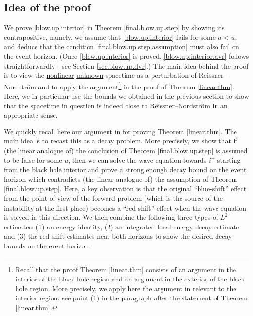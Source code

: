 \documentclass[10pt, reqno]{amsart}
\theoremstyle{definition}
\theoremstyle{remark}
\numberwithin{equation}{section}
\newcommand{\0}{\emptyset}
\begin{document}
\subsection{Idea of the proof}\label{idea.instab}

We prove \eqref{blow.up.interior} in Theorem \ref{final.blow.up.step} by showing its contrapositive, namely, we assume that \eqref{blow.up.interior} fails for some $u<u_s$ and deduce that the condition \eqref{final.blow.up.step.assumption} must also fail on the event horizon. (Once \eqref{blow.up.interior} is proved, \eqref{blow.up.interior.dvr} follows straightforwardly - see Section \ref{sec.blow.up.dvr}.) The main idea behind the proof is to view the \underline{nonlinear} \underline{unknown} spacetime as a perturbation of Reissner--Nordstr\"om and to apply the argument\footnote{Recall that the proof Theorem \ref{linear.thm} consists of an argument in the interior of the black hole region and an argument in the exterior of the black hole region. More precisely, we apply here the argument in \cite{LO.instab} relevant to the interior region: see point (1) in the paragraph after the statement of Theorem \ref{linear.thm}.} in the proof of Theorem \ref{linear.thm}. Here, we in particular use the bounds we obtained in the previous section to show that the spacetime in question is indeed close to Reissner--Nordstr\"om in an appropriate sense. 

We quickly recall here our argument in \cite{LO.instab} for proving Theorem \ref{linear.thm}. The main idea is to recast this as a decay problem. More precisely, we show that if (the linear analogue of) the conclusion of Theorem \ref{final.blow.up.step} is assumed to be false for some $u$, then we can solve the wave equation towards $i^+$ starting from the black hole interior and prove a strong enough decay bound on the event horizon which contradicts (the linear analogue of) the assumption of Theorem \ref{final.blow.up.step}. Here, a key observation is that 
the original ``blue-shift'' effect from the point of view of the forward problem (which is the source of the instability at the first place) becomes a ``red-shift'' effect when the wave equation is solved in this direction. We then combine the following three types of $L^2$ estimates: (1) an energy identity, (2) an integrated local energy decay estimate and (3) the red-shift estimates near both horizons to show the desired decay bounds on the event horizon.

\end{document}

